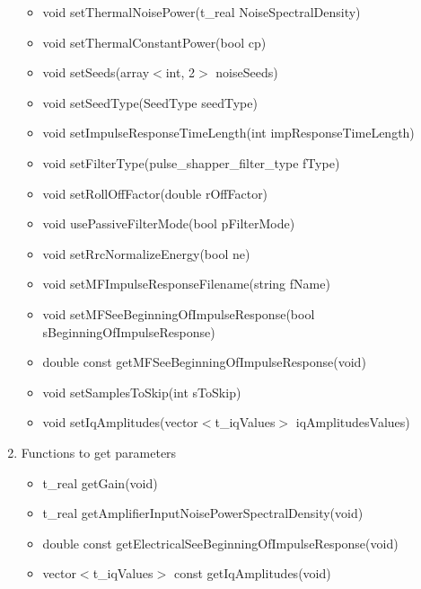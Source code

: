 \begin{enumerate}
\begin{itemize}
                \item void setThermalNoisePower(t\_real NoiseSpectralDensity)
                \item void setThermalConstantPower(bool cp)
                \item void setSeeds(array$<$int, 2$>$ noiseSeeds)
                \item void setSeedType(SeedType seedType)\\
                \item void setImpulseResponseTimeLength(int impResponseTimeLength)
                \item void setFilterType(pulse\_shapper\_filter\_type fType)
                \item void setRollOffFactor(double rOffFactor)
                \item void usePassiveFilterMode(bool pFilterMode)
                \item void setRrcNormalizeEnergy(bool ne)
                \item void setMFImpulseResponseFilename(string fName)
                \item void setMFSeeBeginningOfImpulseResponse(bool sBeginningOfImpulseResponse)
                \item double const getMFSeeBeginningOfImpulseResponse(void)\\
                \item void setSamplesToSkip(int sToSkip)\\
                \item void setIqAmplitudes(vector$<$t\_iqValues$>$ iqAmplitudesValues)\\
             \end{itemize}
\item Functions to get parameters
             \begin{itemize}
                \item t\_real getGain(void)
                \item t\_real getAmplifierInputNoisePowerSpectralDensity(void)
                \item double const getElectricalSeeBeginningOfImpulseResponse(void)
                \item vector$<$t\_iqValues$>$ const getIqAmplitudes(void)
             \end{itemize}
\end{enumerate}
\pagebreak
